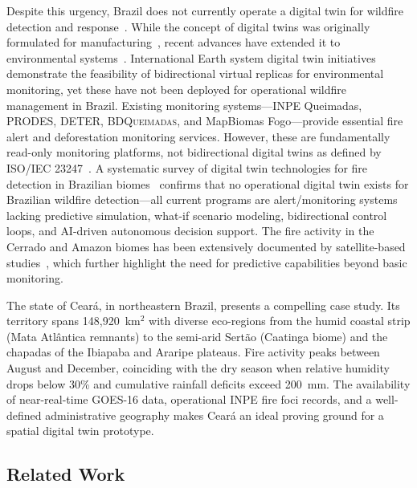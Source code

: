 \documentclass[5p,twocolumn]{elsarticle}
\newcommand{\abbrev}[1]{{\small\textsc{#1}}}
\begin{document}
Despite this urgency, Brazil does not currently operate a digital twin for wildfire detection and response~\cite{morsali2026,raha2025}. While the concept of digital twins was originally formulated for manufacturing~\cite{grieves2014,tao2019,barricelli2019}, recent advances have extended it to environmental systems~\cite{rasheed2020,fuller2020,jones2020}. International Earth system digital twin initiatives~\cite{bauer2021_nature,voosen2020,nativi2021,bauer2023_natrev} demonstrate the feasibility of bidirectional virtual replicas for environmental monitoring, yet these have not been deployed for operational wildfire management in Brazil. Existing monitoring systems---\abbrev{INPE} Queimadas, \abbrev{PRODES}, \abbrev{DETER}, \abbrev{BDQueimadas}, and MapBiomas Fogo---provide essential fire alert and deforestation monitoring services. However, these are fundamentally read-only monitoring platforms, not bidirectional digital twins as defined by \abbrev{ISO}/\abbrev{IEC} 23247~\cite{iso2021}. A systematic survey of digital twin technologies for fire detection in Brazilian biomes~\cite{mukkavilli2023,prapas2023} confirms that no operational digital twin exists for Brazilian wildfire detection---all current programs are alert/monitoring systems lacking predictive simulation, what-if scenario modeling, bidirectional control loops, and \abbrev{AI}-driven autonomous decision support. The fire activity in the Cerrado and Amazon biomes has been extensively documented by satellite-based studies~\cite{barbosa2024_amazon,cano2024_latam}, which further highlight the need for predictive capabilities beyond basic monitoring.

The state of Cear\'{a}, in northeastern Brazil, presents a compelling case study. Its territory spans 148,920~km$^2$ with diverse eco-regions from the humid coastal strip (Mata Atl\^{a}ntica remnants) to the semi-arid Sert\~{a}o (Caatinga biome) and the chapadas of the Ibiapaba and Araripe plateaus. Fire activity peaks between August and December, coinciding with the dry season when relative humidity drops below 30\% and cumulative rainfall deficits exceed 200~mm. The availability of near-real-time \abbrev{GOES-16} data, operational \abbrev{INPE} fire foci records, and a well-defined administrative geography makes Cear\'{a} an ideal proving ground for a spatial digital twin prototype.

\subsection{Related Work}
\end{document}
